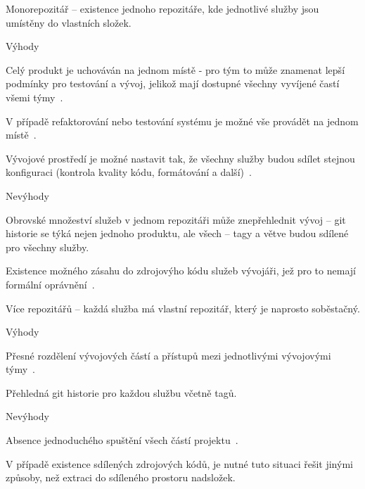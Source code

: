 \begin{dl}
   \item[Monorepozitář] – existence jednoho repozitáře, kde jednotlivé služby jsou umístěny do vlastních složek.

   Výhody
   \begin{ul}
      \item Celý produkt je uchováván na jednom místě - pro tým to může znamenat lepší podmínky pro testování a vývoj, jelikož mají dostupné všechny vyvíjené častí všemi týmy~\cite{monomulti}.
      \item V případě refaktorování nebo testování systému je možné vše provádět na jednom místě~\cite{monomulti}.
      \item Vývojové prostředí je možné nastavit tak, že všechny služby budou sdílet stejnou konfiguraci (kontrola kvality kódu, formátování a další)~\cite{monomulti}.
   \end{ul}

   Nevýhody
   \begin{ul}
      \item Obrovské množeství služeb v jednom repozitáři může znepřehlednit vývoj – git historie se týká nejen jednoho produktu, ale všech – tagy a větve budou sdílené pro všechny služby.
      \item Existence možného zásahu do zdrojovýho kódu služeb vývojáři, jež pro to nemají formální oprávnění~\cite{monomulti}.
   \end{ul}

   \item[Více repozitářů] – každá služba má vlastní repozitář, který je naprosto soběstačný.

   Výhody
   \begin{ul}
      \item Přesné rozdělení vývojových částí a přístupů mezi jednotlivými vývojovými týmy~\cite{monomulti}.
      \item Přehledná git historie pro každou službu včetně tagů.

   \end{ul}

   Nevýhody
   \begin{ul}
      \item Absence jednoduchého spuštění všech částí projektu~\cite{monomulti}.
      \item V případě existence sdílených zdrojových kódů, je nutné tuto situaci řešit jinými způsoby, než extraci do sdíleného prostoru nadsložek.
   \end{ul}
\end{dl}


